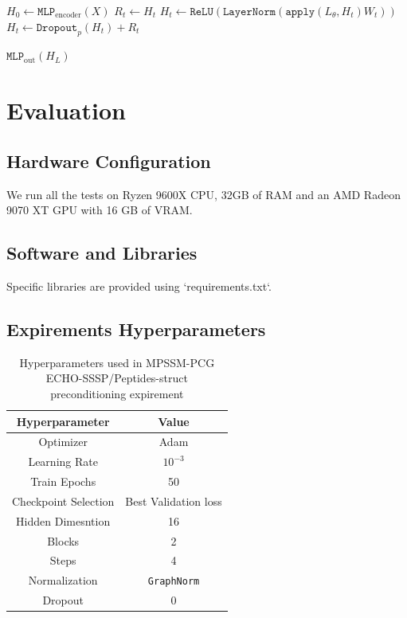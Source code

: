 \begin{algorithm}[H]
    \caption{PGCN For ECHO-SSSP}
    \label{alg:pgcn}
    \begin{algorithmic}[1]
        \State $H_0 \gets \texttt{MLP}_{\text{encoder}}(X)$
        \State $R_t\gets H_t$
        \State $H_t \gets \texttt{ReLU}(\texttt{LayerNorm}(\texttt{apply}(L_\theta,H_t)W_t))$ 
        \State $H_t \gets \texttt{Dropout}_p(H_{t}) + R_t$
        \EndFor

        \State \Return $\texttt{MLP}_{\text{out}}(H_L)$
    \end{algorithmic}
\end{algorithm}

\section{Evaluation}
\subsection{Hardware Configuration}
We run all the tests on Ryzen 9600X CPU, 32GB of RAM and an AMD Radeon 9070 XT GPU with 16 GB of VRAM.

\subsection{Software and Libraries}
Specific libraries are provided using `requirements.txt`. 

\subsection{Expirements Hyperparameters}
\begin{table}[H]
    \centering
    \label{tbl:hyperparams_mpssmpcg}
    \caption{Hyperparameters used in MPSSM-PCG ECHO-SSSP/Peptides-struct preconditioning expirement}
    \small
    \begin{tabular}{c c}
        Hyperparameter       & Value                \\
        \hline
        Optimizer            & Adam                 \\
        Learning Rate        & $10^{-3}$            \\
        Train Epochs         & 50                   \\
        Checkpoint Selection & Best Validation loss \\
        Hidden Dimesntion    & 16                   \\
        Blocks               & 2                    \\
        Steps                & 4                    \\
        Normalization        & \texttt{GraphNorm}   \\
        Dropout              & 0                    \\
    \end{tabular}
\end{table}

